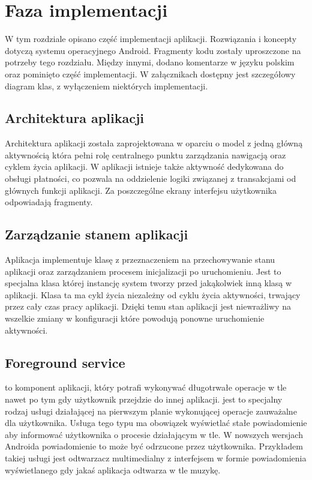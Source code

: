 \section{Faza implementacji}
W tym rozdziale opisano część implementacji aplikacji. Rozwiązania i koncepty dotyczą systemu operacyjnego Android. Fragmenty kodu zostały uproszczone na potrzeby tego rozdziału. Między innymi, dodano komentarze w języku polskim oraz pominięto część implementacji. W załącznikach dostępny jest szczegółowy diagram klas, z wyłączeniem niektórych implementacji.

\subsection{Architektura aplikacji}
Architektura aplikacji została zaprojektowana w oparciu o model z jedną główną aktywnością która pełni rolę centralnego punktu zarządzania nawigacją oraz cyklem życia aplikacji. W aplikacji istnieje także aktywność dedykowana do obsługi płatności, co pozwala na oddzielenie logiki związanej z transakcjami od głównych funkcji aplikacji. Za poszczególne ekrany interfejsu użytkownika odpowiadają fragmenty.

\subsection{Zarządzanie stanem aplikacji}
Aplikacja implementuje klasę  z przeznaczeniem na przechowywanie stanu aplikacji oraz zarządzaniem procesem inicjalizacji po uruchomieniu. Jest to specjalna klasa której instancję system tworzy przed jakąkolwiek inną klasą w aplikacji. Klasa ta ma cykl życia niezależny od cyklu życia aktywności, trwający przez cały czas pracy aplikacji. Dzięki temu stan aplikacji jest niewrażliwy na wszelkie zmiany w konfiguracji które powodują ponowne uruchomienie aktywności.

\newpage

\subsection{Foreground service}
 to komponent aplikacji, który potrafi wykonywać długotrwałe operacje w tle nawet po tym gdy użytkownik przejdzie do innej aplikacji.  jest to specjalny rodzaj usługi działającej na pierwszym planie wykonującej operacje zauważalne dla użytkownika. Usługa tego typu ma obowiązek wyświetlać stałe powiadomienie aby informować użytkownika o procesie działającym w tle. W nowszych wersjach Androida powiadomienie to może być odrzucone przez użytkownika. Przykładem takiej usługi jest odtwarzacz multimedialny z interfejsem w formie powiadomienia wyświetlanego gdy jakaś aplikacja odtwarza w tle muzykę.\\

